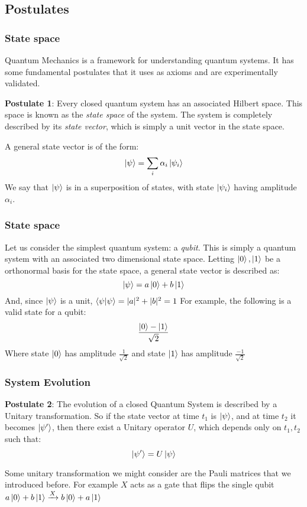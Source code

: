 \documentclass{beamer}
\begin{document}
\subsection{Postulates}
\begin{frame}
    \frametitle{State space}
    Quantum Mechanics is a framework for understanding quantum systems.
    It has some fundamental postulates that it uses as axioms and are experimentally validated.
    \begin{definition}
        \textbf{Postulate 1}: Every closed quantum system has an associated Hilbert space.
        This space is known as the \textit{state space} of the system. The system is completely described by its
        \textit{state vector}, which is simply a unit vector in the state space.
    \end{definition}
    A general state vector is of the form:
    \begin{equation}
        \ket{\psi} = \sum_i \alpha_i \ket{\psi_i}
    \end{equation}
    We say that $\ket{\psi}$ is in a superposition of states, with state $\ket{\psi_i}$ having amplitude $\alpha_i$.
\end{frame}
\begin{frame}
    \frametitle{State space}
    \begin{example}
        Let us consider the simplest quantum system: a \textit{qubit}.
        This is simply a quantum system with an associated two dimensional state space.
        Letting $\ket{0}, \ket{1}$ be a orthonormal basis for the state space, a general state vector
        is described as:
        \begin{equation}
            \ket{\psi} = a \ket{0} + b \ket{1}
        \end{equation}
        And, since $\ket{\psi}$ is a unit, $\braket{\psi|\psi} = |a|^2 + |b|^2 = 1$
        For example, the following is a valid state for a qubit:
        \begin{equation}
            \frac{\ket{0} - \ket{1}}{\sqrt{2}}
        \end{equation}
        Where state $\ket{0}$ has amplitude $\frac{1}{\sqrt{2}}$ and state $\ket{1}$ has amplitude $\frac{-1}{\sqrt{2}}$
    \end{example}
\end{frame}
\begin{frame}
    \frametitle{System Evolution}
    \begin{definition}
        \textbf{Postulate 2}: The evolution of a closed Quantum System is described by a
        Unitary transformation. So if the state vector at time $t_1$ is $\ket{\psi}$,
        and at time $t_2$ it becomes $\ket{\psi'}$, then there exist a Unitary operator $U$,
        which depends only on $t_1, t_2$ such that:
        \begin{equation}
            \ket{\psi'} = U \ket{\psi}
        \end{equation}

    \end{definition}
    Some unitary transformation we might consider are the Pauli matrices that we introduced before.
    For example $X$ acts as a gate that flips the single qubit $a\ket{0} + b\ket{1} \xrightarrow{X} b\ket{0} + a\ket{1}$
\end{frame}
\end{document}
